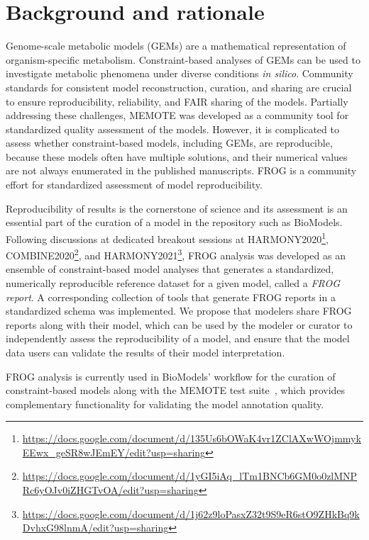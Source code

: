 \chapter{Background and rationale}

Genome-scale metabolic models (GEMs) are a mathematical representation of organism-specific metabolism. Constraint-based analyses of GEMs can be used to investigate metabolic phenomena under diverse conditions \textit{in silico}.  Community standards for consistent model reconstruction, curation, and sharing are crucial to ensure reproducibility, reliability, and FAIR sharing of the models. Partially addressing these challenges, MEMOTE was developed as a community tool for standardized quality assessment of the models. However, it is complicated to assess whether constraint-based models, including GEMs, are reproducible, because these models often have multiple solutions, and their numerical values are not always enumerated in the published manuscripts. FROG is a community effort for standardized assessment of model reproducibility.

Reproducibility of results is the cornerstone of science and its assessment is an essential part of the curation of a model in the repository such as BioModels. Following discussions at dedicated breakout sessions at HARMONY2020\footnote{\url{https://docs.google.com/document/d/135Us6bOWaK4vr1ZClAXwWOjmmykEEwx_geSR8wJEmEY/edit?usp=sharing}}, COMBINE2020\footnote{\url{https://docs.google.com/document/d/1yGI5iAq_lTm1BNCb6GM0o0zlMNPRc6yOJv0iZHGTvOA/edit?usp=sharing}}, and HARMONY2021\footnote{\url{https://docs.google.com/document/d/1j62z9loPasxZ32t9S9eR6stO9ZHkBq9kDvhxG98lnmA/edit?usp=sharing}}, FROG analysis was developed as an ensemble of constraint-based model analyses that generates a standardized, numerically reproducible reference dataset for a given model, called a \emph{FROG report}. A corresponding collection of tools that generate FROG reports in a standardized schema was implemented. We propose that modelers share FROG reports along with their model, which can be used by the modeler or curator to independently assess the reproducibility of a model, and ensure that the model data users can validate the results of their model interpretation.

FROG analysis is currently used in BioModels' workflow for the curation of constraint-based models along with the MEMOTE test suite~\cite{lieven2020memote}, which provides complementary functionality for validating the model annotation quality.

